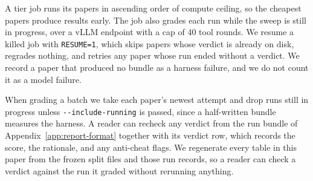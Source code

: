 A tier job runs its papers in ascending order of compute ceiling, so the
cheapest papers produce results early. The job also grades each run while the
sweep is still in progress, over a vLLM endpoint with a cap of 40 tool rounds.
We resume a killed job with \texttt{RESUME=1}, which skips papers whose
verdict is already on disk, regrades nothing, and retries any paper whose run
ended without a verdict. We record a paper that produced no bundle as a
harness failure, and we do not count it as a model failure.

When grading a batch we take each paper's newest attempt and drop runs still in
progress unless \texttt{-{}-include-running} is passed, since a half-written
bundle measures the harness. A reader can recheck any verdict from the run
bundle of Appendix~\ref{app:report-format} together with its verdict row,
which records the score, the rationale, and any anti-cheat flags. We
regenerate every table in this paper from the frozen split files and those run
records, so a reader can check a verdict against the run it graded without
rerunning anything.
